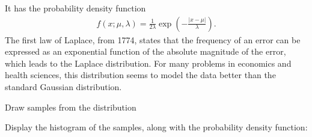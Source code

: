 \documentclass[letterpaper,10pt,english]{sphinxmanual}
\begin{document}
\begin{fulllineitems}
It has the probability density function
\begin{equation*}
\begin{split}f(x; \mu, \lambda) = \frac{1}{2\lambda}
\exp\left(-\frac{|x - \mu|}{\lambda}\right).\end{split}
\end{equation*}
The first law of Laplace, from 1774, states that the frequency
of an error can be expressed as an exponential function of the
absolute magnitude of the error, which leads to the Laplace
distribution. For many problems in economics and health
sciences, this distribution seems to model the data better
than the standard Gaussian distribution.

Draw samples from the distribution

\begin{sphinxVerbatim}[commandchars=\\\{\}]
    
    
\end{sphinxVerbatim}

Display the histogram of the samples, along with
the probability density function:

\begin{sphinxVerbatim}[commandchars=\\\{\}]
   
      
    
  
 
\end{sphinxVerbatim}


\end{fulllineitems}
\end{document}
